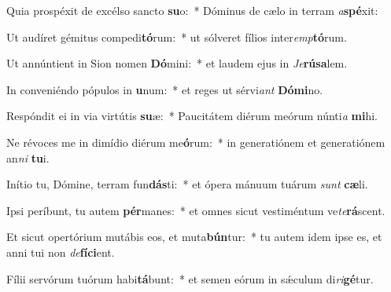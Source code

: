 \item Quia prospéxit de excélso sancto \textbf{su}o:~* Dóminus de cælo in terram \textit{a}\textbf{spé}xit:
\item Ut audíret gémitus compedi\textbf{tó}rum:~* ut sólveret fílios inter\textit{emp}\textbf{tó}rum.
\item Ut annúntient in Sion nomen \textbf{Dó}mini:~* et laudem ejus in \textit{Je}\textbf{rú}\textbf{sa}lem.
\item In conveniéndo pópulos in \textbf{u}num:~* et reges ut sérvi\textit{ant} \textbf{Dó}\textbf{mi}no.
\item Respóndit ei in via virtútis \textbf{su}æ:~* Paucitátem diérum meórum núnti\textit{a} \textbf{mi}hi.
\item Ne révoces me in dimídio diérum me\textbf{ó}rum:~* in generatiónem et generatiónem an\textit{ni} \textbf{tu}i.
\item Inítio tu, Dómine, terram fun\textbf{dás}ti:~* et ópera mánuum tuárum \textit{sunt} \textbf{cæ}li.
\item Ipsi períbunt, tu autem \textbf{pér}manes:~* et omnes sicut vestiméntum ve\textit{te}\textbf{rá}scent.
\item Et sicut opertórium mutábis eos, et muta\textbf{bún}tur:~* tu autem idem ipse es, et anni tui non \textit{de}\textbf{fí}\textbf{ci}ent.
\item Fílii servórum tuórum habi\textbf{tá}bunt:~* et semen eórum in sǽculum di\textit{ri}\textbf{gé}tur.
